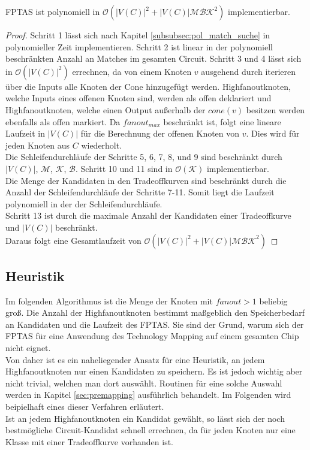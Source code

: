 \documentclass[11pt, a4paper, german]{article}
\newcommand{\TM}{Technology  Mapping }
\begin{document}
\begin{lemma}
	FPTAS ist polynomiell in $\mathcal{O}(|V(C)|^2 + |V(C)|\mathcal{MBK}^2)$ implementierbar.
\end{lemma}
\begin{proof}
Schritt 1 lässt sich nach Kapitel \ref{subsubsec:pol_match_suche} in polynomieller Zeit implementieren. Schritt 2 ist linear in der polynomiell beschränkten Anzahl an Matches im gesamten Circuit.  Schritt 3 und  4 lässt sich in $\mathcal{O}(|V(C)|^2)$ errechnen, da von einem Knoten $v$ ausgehend durch iterieren über die Inputs alle Knoten der Cone hinzugefügt werden.  Highfanoutknoten, welche Inputs eines offenen Knoten sind, werden als offen deklariert und Highfanoutknoten, welche einen Output außerhalb der $cone(v)$ besitzen werden ebenfalls als offen markiert. Da $fanout_{max}$ beschränkt ist, folgt eine lineare Laufzeit in $|V(C)|$ für die Berechnung der offenen Knoten von $v$. Dies wird für jeden Knoten aus $C$ wiederholt. \\
Die  Schleifendurchläufe der Schritte 5, 6, 7, 8,  und 9 sind beschränkt durch $|V(C)|$, $\mathcal{M}$,  $\mathcal{K}$, $\mathcal{B}$. Schritt 10 und 11 sind in $\mathcal{O}(\mathcal{K})$ implementierbar.\\
Die Menge der Kandidaten in den Tradeoffkurven sind beschränkt durch die Anzahl der Schleifendurchläufe der Schritte 7-11.  Somit liegt die Laufzeit polynomiell in der der Schleifendurchläufe. \\
Schritt 13 ist durch die maximale Anzahl der Kandidaten einer Tradeoffkurve und $|V(C)|$ beschränkt.\\
Daraus folgt eine Gesamtlaufzeit von $\mathcal{O}(|V(C)|^2 + |V(C)|\mathcal{MBK}^2)$
\end{proof}

\subsection{Heuristik}
\label{subsec:heuristik}
Im folgenden Algorithmus ist die Menge der Knoten mit $fanout > 1$ beliebig groß.
Die Anzahl der Highfanoutknoten bestimmt maßgeblich den Speicherbedarf an Kandidaten und die Laufzeit des FPTAS. Sie sind der Grund, warum sich der FPTAS für eine Anwendung des \TM auf einem gesamten Chip nicht eignet. \\
Von daher ist es ein naheliegender Ansatz für eine Heuristik, an jedem Highfanoutknoten nur einen Kandidaten zu speichern. Es ist jedoch wichtig aber nicht trivial, welchen man dort auswählt. Routinen für eine solche Auswahl werden in Kapitel \ref{sec:premapping} ausführlich behandelt. Im Folgenden wird beipielhaft eines dieser Verfahren erläutert. \\
Ist an jedem Highfanoutknoten ein Kandidat gewählt, so lässt sich der noch bestmögliche Circuit-Kandidat schnell errechnen, da für jeden Knoten nur eine Klasse mit einer Tradeoffkurve vorhanden ist.\\
\end{document}
